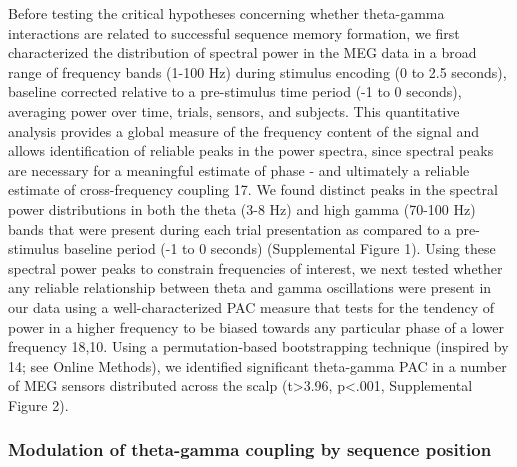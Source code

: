 Before testing the critical hypotheses concerning whether theta-gamma
interactions are related to successful sequence memory formation, we
first characterized the distribution of spectral power in the MEG data
in a broad range of frequency bands (1-100 Hz) during stimulus encoding
(0 to 2.5 seconds), baseline corrected relative to a pre-stimulus time
period (-1 to 0 seconds), averaging power over time, trials, sensors,
and subjects. This quantitative analysis provides a global measure of
the frequency content of the signal and allows identification of
reliable peaks in the power spectra, since spectral peaks are necessary
for a meaningful estimate of phase - and ultimately a reliable estimate
of cross-frequency coupling 17. We found distinct peaks in the spectral
power distributions in both the theta (3-8 Hz) and high gamma (70-100
Hz) bands that were present during each trial presentation as compared
to a pre-stimulus baseline period (-1 to 0 seconds) (Supplemental Figure
1). Using these spectral power peaks to constrain frequencies of
interest, we next tested whether any reliable relationship between theta
and gamma oscillations were present in our data using a
well-characterized PAC measure that tests for the tendency of power in a
higher frequency to be biased towards any particular phase of a lower
frequency 18,10. Using a permutation-based bootstrapping technique
(inspired by 14; see Online Methods), we identified significant
theta-gamma PAC in a number of MEG sensors distributed across the scalp
(t\textgreater{}3.96, p\textless{}.001, Supplemental Figure 2).

\subsubsection{Modulation of theta-gamma coupling by sequence
position}\label{modulation-of-theta-gamma-coupling-by-sequence-position}

